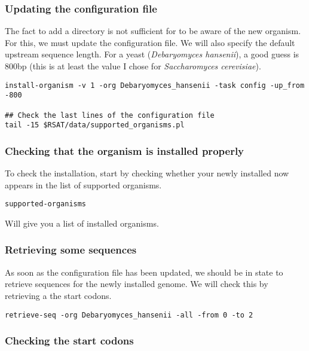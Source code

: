 \subsubsection{Updating the configuration file}

The fact to add a directory is not sufficient for \RSAT to be aware of
the new organism. For this, we must update the configuration file. We
will also specify the default upstream sequence length. For a yeast
(\textit{Debaryomyces hansenii}), a good guess is 800bp (this is at
least the value I chose for \textit{Saccharomyces cerevisiae}).

\begin{verbatim}
install-organism -v 1 -org Debaryomyces_hansenii -task config -up_from -800

## Check the last lines of the configuration file
tail -15 $RSAT/data/supported_organisms.pl
\end{verbatim}


\subsubsection{Checking that the organism is installed properly}

To check the installation, start by checking whether your newly
installed now appears in the list of supported organisms.

\begin{verbatim}
supported-organisms
\end{verbatim}

Will give you a list of installed organisms.


\subsubsection{Retrieving some sequences}

As soon as the configuration file has been updated, we should be in
state to retrieve sequences for the newly installed genome. We will
check this by retrieving a the start codons.

\begin{verbatim}
retrieve-seq -org Debaryomyces_hansenii -all -from 0 -to 2
\end{verbatim}

\subsubsection{Checking the start codons}

